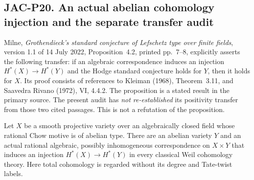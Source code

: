 \subsection*{JAC-P20. An actual abelian cohomology injection and the separate transfer audit}

Milne, \emph{Grothendieck's standard conjecture of Lefschetz type
over finite fields}, version 1.1 of 14 July 2022, Proposition~4.2,
printed pp.~7--8, explicitly asserts the following transfer:
if an algebraic correspondence induces an injection
$H^*(X)\longrightarrow H^*(Y)$ and the Hodge standard conjecture
holds for $Y$, then it holds for $X$.
Its proof consists of references to Kleiman (1968), Theorem~3.11,
and Saavedra Rivano (1972), VI, 4.4.2.
The proposition is a stated result in the primary source.
The present audit has \emph{not re-established} its positivity
transfer from those two cited passages. This is not a refutation
of the proposition.

\begin{lemma}[JAC-P20]\label{jac:P20}
Let $X$ be a smooth projective variety over an algebraically
closed field whose rational Chow motive is of abelian type.
There are an abelian variety $Y$ and an actual rational algebraic,
possibly inhomogeneous correspondence on $X\times Y$ that induces
an injection $H^*(X)\longrightarrow H^*(Y)$ in every classical
Weil cohomology theory. Here total cohomology is regarded without
its degree and Tate-twist labels.
\end{lemma}

